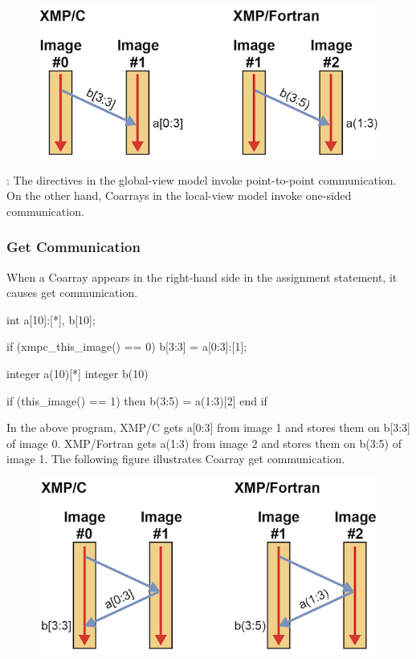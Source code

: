 \begin{figure}
  \centering
  \includegraphics{figs/put.png}
\end{figure}

\noindent\hrulefill

: The directives in the global-view model invoke
point-to-point
communication. On the other hand, Coarrays in the local-view model
invoke one-sided communication.

\noindent\hrulefill

\subsubsection{Get Communication}

When a Coarray appears in the right-hand side in the assignment
statement, it causes get communication.

\begin{XCexample}
int a[10]:[*], b[10];

if (xmpc_this_image() == 0)
  b[3:3] = a[0:3]:[1];
\end{XCexample}

\begin{XFexample}
integer a(10)[*]
integer b(10)

if (this_image() == 1) then
  b(3:5) = a(1:3)[2]
end if
\end{XFexample}

In the above program, XMP/C gets a[0:3] from image 1 and stores them on
b[3:3] of image 0. XMP/Fortran gets a(1:3) from image 2 and stores them
on b(3:5) of image 1. The following figure illustrates Coarray get
communication.

\begin{figure}
  \centering
  \includegraphics{figs/get.png}
\end{figure}

